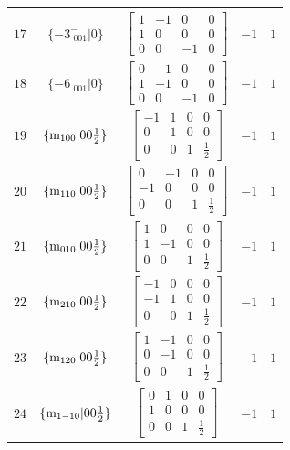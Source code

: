 \documentclass[fleqn,8pt]{jsarticle}
\begin{document}
\begin{longtable}{ccccc}
$ 17 $ & $ \{-3^{-}_{\,\,001}|0\} $ & $ \begin{bmatrix} 1 & -1 & 0 & 0 \\ 1 & 0 & 0 & 0 \\ 0 & 0 & -1 & 0 \end{bmatrix} $ & $ -1 $ & $ 1 $ \\ \hline
$ 18 $ & $ \{-6^{-}_{\,\,001}|0\} $ & $ \begin{bmatrix} 0 & -1 & 0 & 0 \\ 1 & -1 & 0 & 0 \\ 0 & 0 & -1 & 0 \end{bmatrix} $ & $ -1 $ & $ 1 $ \\ \hline
$ 19 $ & $ \{{\rm m}_{100}|0 0 \frac{1}{2}\} $ & $ \begin{bmatrix} -1 & 1 & 0 & 0 \\ 0 & 1 & 0 & 0 \\ 0 & 0 & 1 & \frac{1}{2} \end{bmatrix} $ & $ -1 $ & $ 1 $ \\ \hline
$ 20 $ & $ \{{\rm m}_{110}|0 0 \frac{1}{2}\} $ & $ \begin{bmatrix} 0 & -1 & 0 & 0 \\ -1 & 0 & 0 & 0 \\ 0 & 0 & 1 & \frac{1}{2} \end{bmatrix} $ & $ -1 $ & $ 1 $ \\ \hline
$ 21 $ & $ \{{\rm m}_{010}|0 0 \frac{1}{2}\} $ & $ \begin{bmatrix} 1 & 0 & 0 & 0 \\ 1 & -1 & 0 & 0 \\ 0 & 0 & 1 & \frac{1}{2} \end{bmatrix} $ & $ -1 $ & $ 1 $ \\ \hline
$ 22 $ & $ \{{\rm m}_{210}|0 0 \frac{1}{2}\} $ & $ \begin{bmatrix} -1 & 0 & 0 & 0 \\ -1 & 1 & 0 & 0 \\ 0 & 0 & 1 & \frac{1}{2} \end{bmatrix} $ & $ -1 $ & $ 1 $ \\ \hline
$ 23 $ & $ \{{\rm m}_{120}|0 0 \frac{1}{2}\} $ & $ \begin{bmatrix} 1 & -1 & 0 & 0 \\ 0 & -1 & 0 & 0 \\ 0 & 0 & 1 & \frac{1}{2} \end{bmatrix} $ & $ -1 $ & $ 1 $ \\ \hline
$ 24 $ & $ \{{\rm m}_{1-10}|0 0 \frac{1}{2}\} $ & $ \begin{bmatrix} 0 & 1 & 0 & 0 \\ 1 & 0 & 0 & 0 \\ 0 & 0 & 1 & \frac{1}{2} \end{bmatrix} $ & $ -1 $ & $ 1 $ \\ \hline

\end{longtable}
\end{document}
